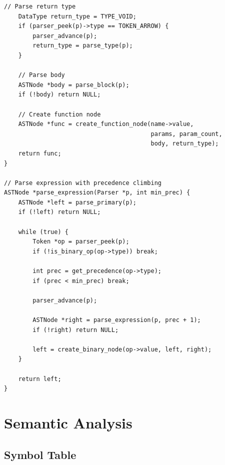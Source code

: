 \documentclass[12pt,a4paper,oneside]{book}
\begin{document}
\begin{lstlisting}[style=c, caption={Recursive Descent Parser}]
    // Parse return type
    DataType return_type = TYPE_VOID;
    if (parser_peek(p)->type == TOKEN_ARROW) {
        parser_advance(p);
        return_type = parse_type(p);
    }
    
    // Parse body
    ASTNode *body = parse_block(p);
    if (!body) return NULL;
    
    // Create function node
    ASTNode *func = create_function_node(name->value, 
                                         params, param_count,
                                         body, return_type);
    return func;
}

// Parse expression with precedence climbing
ASTNode *parse_expression(Parser *p, int min_prec) {
    ASTNode *left = parse_primary(p);
    if (!left) return NULL;
    
    while (true) {
        Token *op = parser_peek(p);
        if (!is_binary_op(op->type)) break;
        
        int prec = get_precedence(op->type);
        if (prec < min_prec) break;
        
        parser_advance(p);
        
        ASTNode *right = parse_expression(p, prec + 1);
        if (!right) return NULL;
        
        left = create_binary_node(op->value, left, right);
    }
    
    return left;
}
\end{lstlisting}

\chapter{Semantic Analysis}

\section{Symbol Table}
\end{document}
